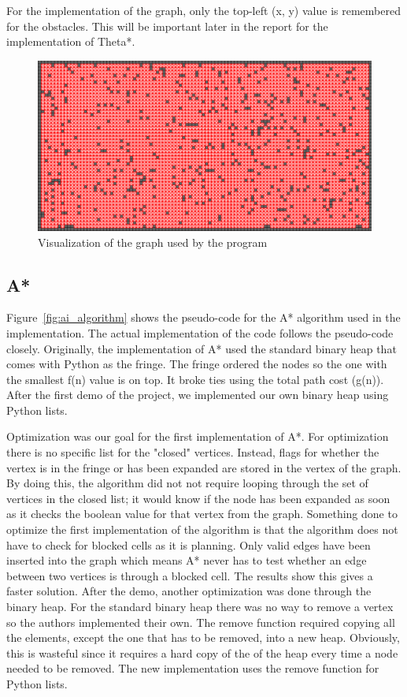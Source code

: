 \documentclass[a4paper,11pt]{report}
\begin{document}
	For the implementation of the graph, only the top-left (x, y) value is remembered for the obstacles. This will be important later in the report for the implementation of Theta*.

	
	\begin{figure}[h!]
	  \centering
	    \includegraphics[width=1\textwidth]{images/graph.png}
	  \caption{Visualization of the graph used by the program}
	  \label{fig:graph_image}
	\end{figure}
	
	\subsection {A*}
	Figure~\ref{fig:ai_algorithm} shows the pseudo-code for the A* algorithm used in the implementation. The actual implementation of the code follows the pseudo-code closely. Originally, the implementation of A* used the standard binary heap that comes with Python as the fringe. The fringe ordered the nodes so the one with the smallest f(n) value is on top. It broke ties using the total path cost (g(n)). After the first demo of the project, we implemented our own binary heap using Python lists. 
	
	Optimization was our goal for the first implementation of A*. For optimization there is no specific list for the "closed" vertices. Instead, flags for whether the vertex is in the fringe or has been expanded are stored in the vertex of the graph. By doing this, the algorithm did not not require looping through the set of vertices in the closed list; it would know if the node has been expanded as soon as it checks the boolean value for that vertex from the graph.
	Something done to optimize the first implementation of the algorithm is that the algorithm does not have to check for blocked cells as it is planning. Only valid edges have been inserted into the graph which means A* never has to test whether an edge between two vertices is through a blocked cell. The results show this gives a faster solution.
	After the demo, another optimization was done through the binary heap. For the standard binary heap there was no way to remove a vertex so the authors implemented their own. The remove function required copying all the elements, except the one that has to be removed, into a new heap. Obviously, this is wasteful since it requires a hard copy of the of the heap every time a node needed to be removed. The new implementation uses the remove function for Python lists.
	
\end{document}
